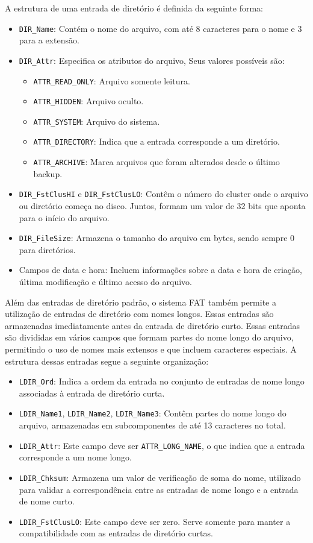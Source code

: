 \documentclass[
    12pt,				%
    oneside,   	        %
    a4paper,			%
    english,			%
    french,				%
    spanish,			%
    brazil,				%
    ]{pacotes/abntex2}
\begin{document}
A estrutura de uma entrada de diretório é definida da seguinte forma:

\begin{itemize} 
    \item \texttt{DIR\_Name}: Contém o nome do arquivo, com até 8 caracteres para o nome e 3 para a extensão.
    \item \texttt{DIR\_Attr}: Especifica os atributos do arquivo, Seus valores possíveis são:
    \begin{itemize} 
        \item \texttt{ATTR\_READ\_ONLY}: Arquivo somente leitura.
        \item \texttt{ATTR\_HIDDEN}: Arquivo oculto.
        \item \texttt{ATTR\_SYSTEM}: Arquivo do sistema.
        \item \texttt{ATTR\_DIRECTORY}: Indica que a entrada corresponde a um diretório.
        \item \texttt{ATTR\_ARCHIVE}: Marca arquivos que foram  alterados desde o último backup.
    \end{itemize}
    \item \texttt{DIR\_FstClusHI} e \texttt{DIR\_FstClusLO}: Contêm o número do cluster onde o arquivo ou diretório começa no disco. Juntos, formam um valor de 32 bits que aponta para o início do arquivo. 
    \item \texttt{DIR\_FileSize}: Armazena o tamanho do arquivo em bytes, sendo sempre 0 para diretórios. 
    \item Campos de data e hora: Incluem informações sobre a data e hora de criação, última modificação e último acesso do arquivo.
\end{itemize}

Além das entradas de diretório padrão, o sistema FAT também permite a utilização de entradas de diretório com nomes longos. Essas entradas são armazenadas imediatamente antes da entrada de diretório curto. Essas entradas são divididas em vários campos que formam partes do nome longo do arquivo, permitindo o uso de nomes mais extensos e que incluem caracteres especiais. A estrutura dessas entradas segue a seguinte organização:

\begin{itemize} 
    \item \texttt{LDIR\_Ord}: Indica a ordem da entrada no conjunto de entradas de nome longo associadas à entrada de diretório curta.
    \item \texttt{LDIR\_Name1}, \texttt{LDIR\_Name2}, \texttt{LDIR\_Name3}: Contêm partes do nome longo do arquivo, armazenadas em subcomponentes de até 13 caracteres no total.
    \item \texttt{LDIR\_Attr}: Este campo deve ser \texttt{ATTR\_LONG\_NAME}, o que indica que a entrada corresponde a um nome longo.
    \item \texttt{LDIR\_Chksum}: Armazena um valor de verificação de soma do nome, utilizado para validar a correspondência entre as entradas de nome longo e a entrada de nome curto.
    \item \texttt{LDIR\_FstClusLO}: Este campo deve ser zero. Serve somente para manter a compatibilidade com as entradas de diretório curtas.
\end{itemize}
\end{document}
